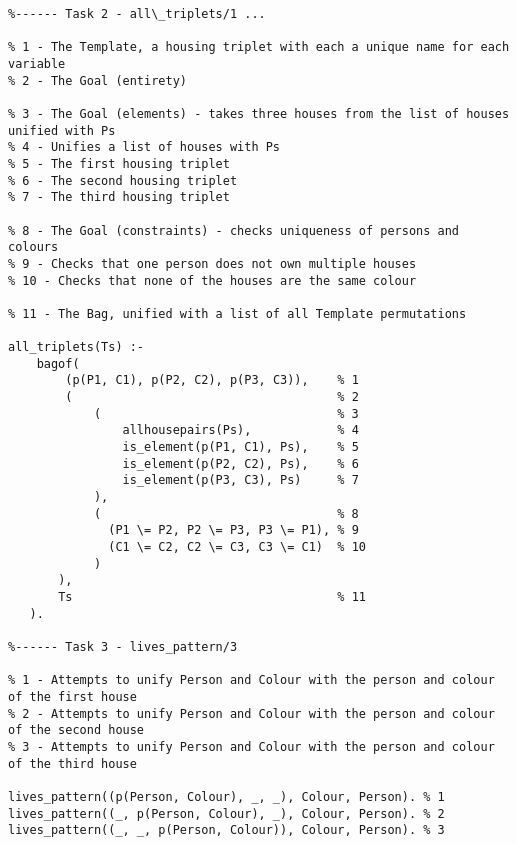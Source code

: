 \documentclass[11pt]{article}
\begin{document}
\newpage
\begin{verbatim}
%------ Task 2 - all\_triplets/1 ...

% 1 - The Template, a housing triplet with each a unique name for each variable
% 2 - The Goal (entirety)

% 3 - The Goal (elements) - takes three houses from the list of houses unified with Ps
% 4 - Unifies a list of houses with Ps
% 5 - The first housing triplet
% 6 - The second housing triplet
% 7 - The third housing triplet

% 8 - The Goal (constraints) - checks uniqueness of persons and colours
% 9 - Checks that one person does not own multiple houses
% 10 - Checks that none of the houses are the same colour

% 11 - The Bag, unified with a list of all Template permutations

all_triplets(Ts) :-
    bagof(
        (p(P1, C1), p(P2, C2), p(P3, C3)),    % 1
        (                                     % 2
            (                                 % 3
                allhousepairs(Ps),            % 4
                is_element(p(P1, C1), Ps),    % 5
                is_element(p(P2, C2), Ps),    % 6
                is_element(p(P3, C3), Ps)     % 7
            ),
            (                                 % 8
              (P1 \= P2, P2 \= P3, P3 \= P1), % 9
              (C1 \= C2, C2 \= C3, C3 \= C1)  % 10
            )
       ),
       Ts                                     % 11
   ).

%------ Task 3 - lives_pattern/3

% 1 - Attempts to unify Person and Colour with the person and colour of the first house
% 2 - Attempts to unify Person and Colour with the person and colour of the second house
% 3 - Attempts to unify Person and Colour with the person and colour of the third house

lives_pattern((p(Person, Colour), _, _), Colour, Person). % 1
lives_pattern((_, p(Person, Colour), _), Colour, Person). % 2
lives_pattern((_, _, p(Person, Colour)), Colour, Person). % 3
\end{verbatim}
\end{document}
